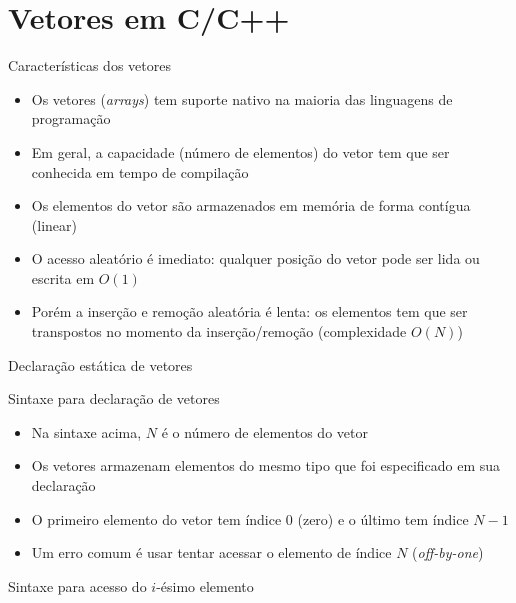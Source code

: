 \section{Vetores em C/C++}

\begin{frame}[fragile]{Características dos vetores}

	\begin{itemize}
		\item Os vetores (\textit{arrays}) tem suporte nativo na maioria das linguagens de 
        programação

		\item Em geral, a capacidade (número de elementos) do vetor tem que ser conhecida em tempo de compilação

		\item Os elementos do vetor são armazenados em memória de forma contígua (linear)

		\item O acesso aleatório é imediato: qualquer posição do vetor pode ser lida ou escrita
		em $O(1)$

		\item Porém a inserção e remoção aleatória é lenta: os elementos tem que ser transpostos no         momento da inserção/remoção (complexidade $O(N)$)
	\end{itemize}

\end{frame} 

\begin{frame}[fragile]{Declaração estática de vetores}

    \begin{block}{Sintaxe para declaração de vetores}
    \end{block}

	\begin{itemize}
		\item Na sintaxe acima, $N$ é o número de elementos do vetor

		\item Os vetores armazenam elementos do mesmo tipo que foi especificado em sua declaração

        \item O primeiro elemento do vetor tem índice 0 (zero) e o último tem índice $N - 1$

        \item Um erro comum é usar tentar acessar o elemento de índice $N$ (\textit{off-by-one})
	\end{itemize}

    \begin{block}{Sintaxe para acesso do $i$-ésimo elemento}
    \end{block}


\end{frame}

